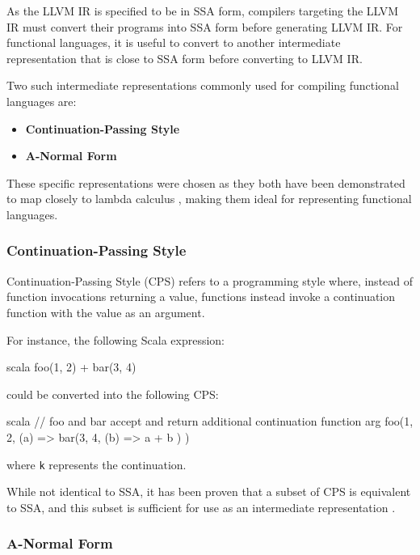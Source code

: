 As the LLVM IR is specified to be in SSA form, compilers targeting the LLVM IR must convert their
programs into SSA form before generating LLVM IR. For functional languages, it is useful to convert
to another intermediate representation that is close to SSA form before converting to LLVM IR.

Two such intermediate representations commonly used for compiling functional languages are:
\begin{itemize}
    \onehalfspacing
    \item \textbf{Continuation-Passing Style}
    \item \textbf{A-Normal Form}
\end{itemize}

These specific representations were chosen as they both have been demonstrated to map closely to
lambda calculus \autocite{morrisett1999systemf,flanagan1993essence}, making them ideal for
representing functional languages.

\subsubsection{Continuation-Passing Style}
\label{sec:cps}

Continuation-Passing Style (CPS) refers to a programming style where, instead of function
invocations returning a value, functions instead invoke a continuation function with the value as
an argument.

For instance, the following Scala expression:

\begin{code}{scala}
    foo(1, 2) + bar(3, 4)
\end{code}

\noindent could be converted into the following CPS:

\begin{code}{scala}
    // foo and bar accept and return additional continuation function arg
    foo(1, 2,
        (a) => bar(3, 4,
            (b) => a + b
        )
    )
\end{code}

\noindent where \texttt{k} represents the continuation.

While not identical to SSA, it has been proven that a subset of CPS is equivalent to SSA, and this
subset is sufficient for use as an intermediate representation \autocite{kelsey1993correspondence}.

\subsubsection{A-Normal Form}

